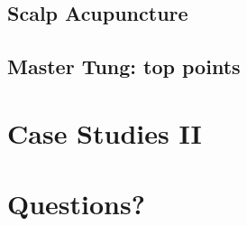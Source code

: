 \subsection{Scalp Acupuncture}

\subsection{Master Tung: top points}

\section{Case Studies II}

\section{Questions?} 

\begin{frame}
\end{frame}


